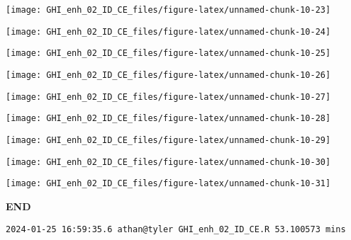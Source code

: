 \documentclass[
  10pt,
  a4paper,oneside]{article}
\begin{document}
\begin{center}\texttt{[image: GHI\_enh\_02\_ID\_CE\_files/figure-latex/unnamed-chunk-10-23]} \end{center}

\begin{center}\texttt{[image: GHI\_enh\_02\_ID\_CE\_files/figure-latex/unnamed-chunk-10-24]} \end{center}

\begin{center}\texttt{[image: GHI\_enh\_02\_ID\_CE\_files/figure-latex/unnamed-chunk-10-25]} \end{center}

\begin{center}\texttt{[image: GHI\_enh\_02\_ID\_CE\_files/figure-latex/unnamed-chunk-10-26]} \end{center}

\begin{center}\texttt{[image: GHI\_enh\_02\_ID\_CE\_files/figure-latex/unnamed-chunk-10-27]} \end{center}

\begin{center}\texttt{[image: GHI\_enh\_02\_ID\_CE\_files/figure-latex/unnamed-chunk-10-28]} \end{center}

\begin{center}\texttt{[image: GHI\_enh\_02\_ID\_CE\_files/figure-latex/unnamed-chunk-10-29]} \end{center}

\begin{center}\texttt{[image: GHI\_enh\_02\_ID\_CE\_files/figure-latex/unnamed-chunk-10-30]} \end{center}

\begin{center}\texttt{[image: GHI\_enh\_02\_ID\_CE\_files/figure-latex/unnamed-chunk-10-31]} \end{center}

\textbf{END}

\begin{verbatim}
2024-01-25 16:59:35.6 athan@tyler GHI_enh_02_ID_CE.R 53.100573 mins
\end{verbatim}
\end{document}
